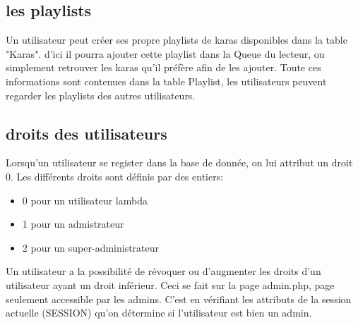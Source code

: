 \subsection{les playlists}

Un utilisateur peut créer ses propre playlists de karas disponibles dans la table "Karas".  d'ici il pourra ajouter cette playlist dans la Queue du lecteur, ou simplement retrouver les karas qu'il préfère afin de les ajouter. Toute ces informations sont contenues dans la table Playlist, les utilisateurs peuvent regarder les playlists des autres utilisateurs. 

\subsection{droits des utilisateurs}
Lorsqu'un utilisateur se register dans la base de donnée, on lui attribut un droit 0. Les différents droits sont définis par des entiers:
\begin{itemize}
	\item 0 pour un utilisateur lambda
	\item 1 pour un admistrateur
	\item 2 pour un super-administrateur
\end{itemize}
Un utilisateur a la possibilité de révoquer ou d'augmenter les droits d'un utilisateur ayant un droit inférieur. Ceci se fait sur la page admin.php, page seulement accessible par les admins. C'est en vérifiant les attributs de la session actuelle (SESSION) qu'on détermine si l'utilisateur est bien un admin.
